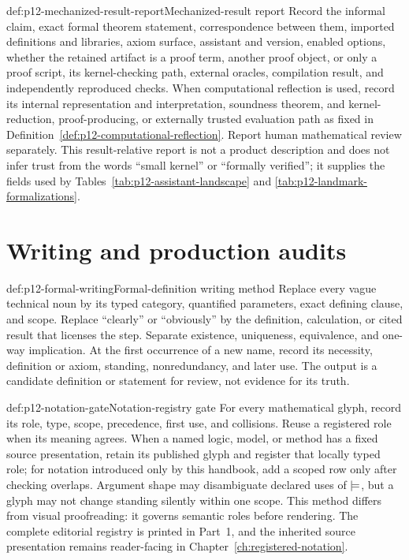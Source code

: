 \begin{hbmethod}{def:p12-mechanized-result-report}{Mechanized-result report}
Record the informal claim, exact formal theorem statement, correspondence
between them, imported definitions and libraries, axiom surface, assistant and
version, enabled options, whether the retained artifact is a proof term,
another proof object, or only a proof script, its kernel-checking path, external
oracles, compilation result, and independently reproduced checks.  When
computational reflection is used, record its internal representation and
interpretation, soundness theorem, and kernel-reduction, proof-producing, or
externally trusted evaluation path as fixed in
Definition~\ref{def:p12-computational-reflection}.  Report human mathematical
review separately.  This result-relative report is not a
product description and does not infer trust from the words “small kernel” or
“formally verified”; it supplies the fields used by
Tables~\ref{tab:p12-assistant-landscape} and
\ref{tab:p12-landmark-formalizations}.
\end{hbmethod}

\section{Writing and production audits}

\begin{hbmethod}{def:p12-formal-writing}{Formal-definition writing method}
Replace every vague technical noun by its typed category, quantified
parameters, exact defining clause, and scope.  Replace “clearly” or “obviously”
by the definition, calculation, or cited result that licenses the step.
Separate existence, uniqueness, equivalence, and one-way implication.  At the
first occurrence of a new name, record its necessity, definition or axiom,
standing, nonredundancy, and later use.  The output is a candidate definition
or statement for review, not evidence for its truth.
\end{hbmethod}

\begin{hbmethod}{def:p12-notation-gate}{Notation-registry gate}
For every mathematical glyph, record its role, type, scope, precedence, first
use, and collisions.  Reuse a registered role when its
meaning agrees.  When a named logic, model, or method has a fixed source
presentation, retain its published glyph and register that locally typed role;
for notation introduced only by this handbook, add a scoped row only after
checking overlaps.  Argument shape may disambiguate declared uses
of \(\models\), but a glyph may not change standing silently within one scope.
This method differs from visual proofreading: it governs semantic roles before
rendering.  The complete editorial registry is printed in Part~1, and the
inherited source presentation remains reader-facing in
Chapter~\ref{ch:registered-notation}.
\end{hbmethod}

